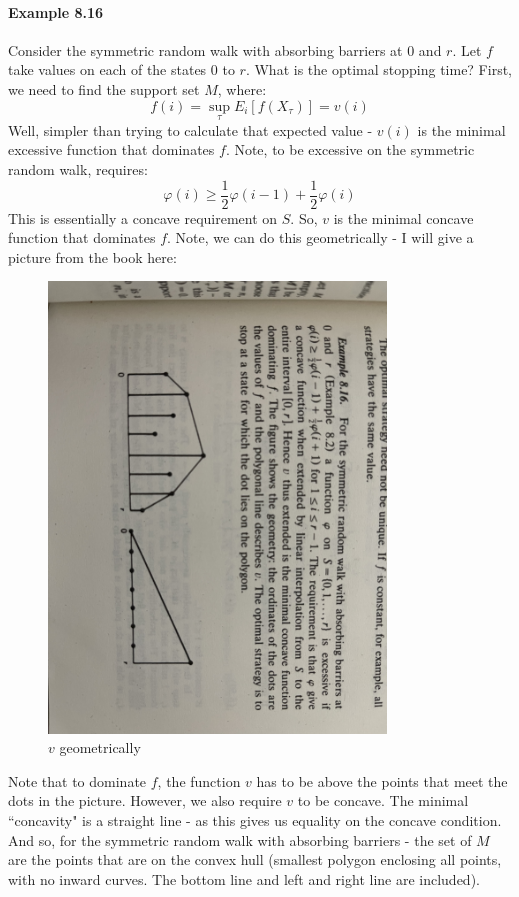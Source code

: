 \documentclass[12pt,a4paper]{article}
\newcommand{\1}[1]{\mathbbm{1}\left\{ #1 \right\}}
\begin{document}
\paragraph{Example 8.16} Consider the symmetric random walk with absorbing barriers at $0$ and $r$. Let $f$ take values on each of the states $0$ to $r$. What is the optimal stopping time? First, we need to find the support set $M$, where:
$$
	f(i) = \sup_{\tau} E_i\left[f(X_\tau)\right] = v(i)
$$
Well, simpler than trying to calculate that expected value - $v(i)$ is the minimal excessive function that dominates $f$. Note, to be excessive on the symmetric random walk, requires:
$$
	\varphi(i) \geq \frac{1}{2}\varphi(i-1) + \frac{1}{2}\varphi(i)
$$
This is essentially a concave requirement on $S$. So, $v$ is the minimal concave function that dominates $f$. Note, we can do this geometrically - I will give a picture from the book here:
\begin{figure}[H]
	\centering
	\includegraphics[width=0.8\textwidth]{excessive_concave.jpg}
	\caption{$v$ geometrically}
	\label{fig:excessive_concave_1}
\end{figure}
Note that to dominate $f$, the function $v$ has to be above the points that meet the dots in the picture. However, we also require $v$ to be concave. The minimal ``concavity" is a straight line - as this gives us equality on the concave condition. And so, for the symmetric random walk with absorbing barriers - the set of $M$ are the points that are on the convex hull (smallest polygon enclosing all points, with no inward curves. The bottom line and left and right line are included).
\end{document}
